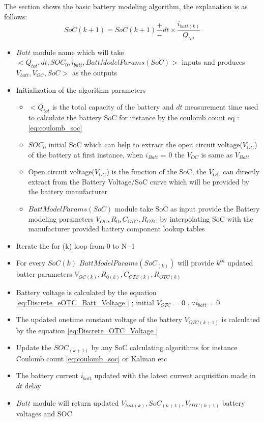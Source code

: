 The section shows the basic battery modeling algorithm, the explanation is as follows:
\begin{equation}\label{eq:coulomb_soc}
    SoC(k+1) =  SoC(k+1) \frac{+}{-} dt\times \frac{i_{batt(k)}}{Q_{tot}}
\end{equation}
\begin{itemize}
    \item $Batt$ module name which will take  $<Q_{tot},dt,SOC_0,i_{batt},BattModelParams(SoC)>$ inputs and produces $V_{batt},V_{OC},SoC>$ as the outputs
    \item Initialization of the algorithm parameters
    \begin{itemize}
        \item $<Q_{tot}$ is the total capacity of the battery and $dt$ measurement time used to calculate the battery SoC for instance by the coulomb count eq :\ref{eq:coulomb_soc}
        \item $SOC_0$ initial SoC which can help to extract the open circuit voltage($V_{OC}$) of the battery at first instance, when $i_{Batt}$ = 0 the $V_{OC}$ is same as $V_{Batt}$
        \item Open circuit voltage($V_{OC}$) is the function of the SoC, the $V_{OC}$ can directly extract from the Battery Voltage/SoC curve which will be provided by the battery manufacturer 
        \item $BattModelParams(SoC)$ module take SoC as input provide the Battery modeling parameters $V_{OC},R_0,C_{OTC},R_{OTC}$ by interpolating SoC with the manufacturer provided battery component lookup tables 
    \end{itemize}
    \item Iterate the for (k) loop  from 0 to N -1
    \item For every $SoC(k)$ $BattModelParams(SoC_{(k)})$ will provide $k^{th}$ updated batter parameters $V_{OC(k)},R_{0(k)},C_{OTC(k)},R_{OTC(k)}$
    \item Battery voltage is calculated by the equation \ref{eq:Discrete_eOTC_Batt_Voltage } ; initial $V_{OTC}$ = 0 , $\because i_{batt} = 0$ 
    \item The updated onetime constant voltage of the battery $V_{OTC(k+1)}$ is calculated by the equation \ref{eq:Discrete_OTC_Voltage }
    \item Update the $SOC_(k+1)$ by any SoC calculating algorithms for instance Coulomb count \ref{eq:coulomb_soc} or Kalman etc
    \item The battery current $i_{batt}$ updated with the latest current acquisition made in $dt$ delay 
    \item $Batt$ module will return updated {$V_{batt(k)},SoC_{(k+1)},V_{OTC(k+1)} $} battery voltages and SOC
\end{itemize}

